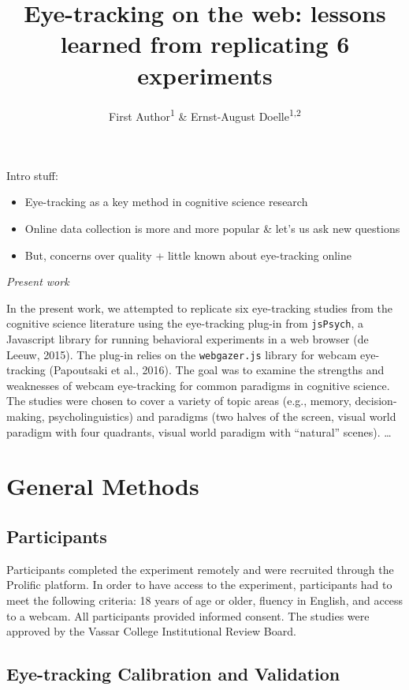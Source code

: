 \documentclass[
  english,
  man,floatsintext]{apa6}
\title{Eye-tracking on the web: lessons learned from replicating 6 experiments}
\author{First Author\textsuperscript{1} \& Ernst-August Doelle\textsuperscript{1,2}}
\date{}
\affiliation{\vspace{0.5cm}\textsuperscript{1} Wilhelm-Wundt-University\\\textsuperscript{2} Konstanz Business School}
\begin{document}
\maketitle

Intro stuff:

\begin{itemize}
\item
  Eye-tracking as a key method in cognitive science research
\item
  Online data collection is more and more popular \& let's us ask new questions
\item
  But, concerns over quality + little known about eye-tracking online
\end{itemize}

\emph{Present work}

In the present work, we attempted to replicate six eye-tracking studies from the cognitive science literature using the eye-tracking plug-in from \texttt{jsPsych}, a Javascript library for running behavioral experiments in a web browser (de Leeuw, 2015). The plug-in relies on the \texttt{webgazer.js} library for webcam eye-tracking (Papoutsaki et al., 2016). The goal was to examine the strengths and weaknesses of webcam eye-tracking for common paradigms in cognitive science. The studies were chosen to cover a variety of topic areas (e.g., memory, decision-making, psycholinguistics) and paradigms (two halves of the screen, visual world paradigm with four quadrants, visual world paradigm with ``natural'' scenes). \ldots{}

\hypertarget{general-methods}{%
\section{General Methods}\label{general-methods}}

\hypertarget{participants}{%
\subsection{Participants}\label{participants}}

Participants completed the experiment remotely and were recruited through the Prolific platform. In order to have access to the experiment, participants had to meet the following criteria: 18 years of age or older, fluency in English, and access to a webcam. All participants provided informed consent. The studies were approved by the Vassar College Institutional Review Board.

\hypertarget{eye-tracking-calibration-and-validation}{%
\subsection{Eye-tracking Calibration and Validation}\label{eye-tracking-calibration-and-validation}}
\end{document}
